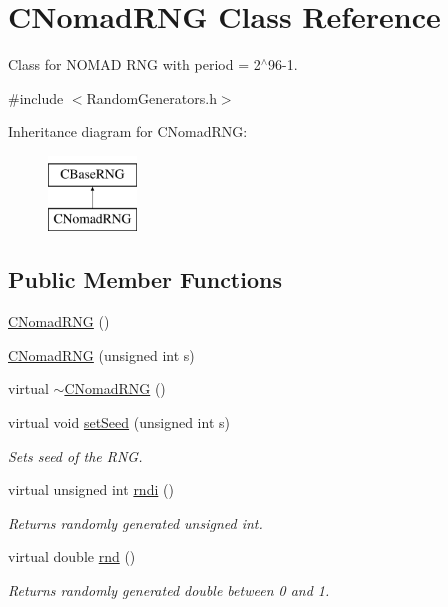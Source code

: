 \hypertarget{class_c_nomad_r_n_g}{\section{C\-Nomad\-R\-N\-G Class Reference}
\label{class_c_nomad_r_n_g}
}


Class for N\-O\-M\-A\-D R\-N\-G with period = 2$^\wedge$96-\/1.  




{\ttfamily \#include $<$Random\-Generators.\-h$>$}

Inheritance diagram for C\-Nomad\-R\-N\-G\-:\begin{figure}[H]
\begin{center}
\leavevmode
\includegraphics[height=2.000000cm]{class_c_nomad_r_n_g}
\end{center}
\end{figure}
\subsection*{Public Member Functions}
\begin{DoxyCompactItemize}
\item 
\hyperlink{class_c_nomad_r_n_g_a1451ce12dd43333a0c0af7668ae3695a}{C\-Nomad\-R\-N\-G} ()
\item 
\hyperlink{class_c_nomad_r_n_g_ae0c0e56faad80fec2a71ce4fb3686a78}{C\-Nomad\-R\-N\-G} (unsigned int s)
\item 
virtual \hyperlink{class_c_nomad_r_n_g_ad8052941c7b1dc31aba60356aa506daf}{$\sim$\-C\-Nomad\-R\-N\-G} ()
\item 
virtual void \hyperlink{class_c_nomad_r_n_g_a6cedb9431179cee4677d415c8e7611c3}{set\-Seed} (unsigned int s)
\begin{DoxyCompactList}\small\item\em Sets seed of the R\-N\-G. \end{DoxyCompactList}\item 
virtual unsigned int \hyperlink{class_c_nomad_r_n_g_ad41c27377065df6efdadc2d1b30ca315}{rndi} ()
\begin{DoxyCompactList}\small\item\em Returns randomly generated unsigned int. \end{DoxyCompactList}\item 
virtual double \hyperlink{class_c_nomad_r_n_g_a80ec634087f50ef6753f1c5fe24c7ad4}{rnd} ()
\begin{DoxyCompactList}\small\item\em Returns randomly generated double between 0 and 1. \end{DoxyCompactList}\end{DoxyCompactItemize}
